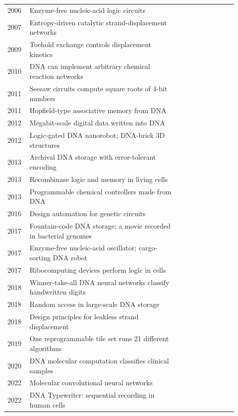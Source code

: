 \begin{center}
\begin{longtable}{@{}p{0.08\linewidth}p{0.62\linewidth}p{0.22\linewidth}@{}}
2006 & Enzyme-free nucleic-acid logic circuits & \cite{Seelig2006}\\
2007 & Entropy-driven catalytic strand-displacement networks & \cite{Zhang2007}\\
2009 & Toehold exchange controls displacement kinetics & \cite{ZhangWinfree2009}\\
2010 & DNA can implement arbitrary chemical reaction networks & \cite{Soloveichik2010}\\
2011 & Seesaw circuits compute square roots of 4-bit numbers & \cite{QianWinfree2011}\\
2011 & Hopfield-type associative memory from DNA & \cite{QianWinfreeBruck2011}\\
2012 & Megabit-scale digital data written into DNA & \cite{Church2012}\\
2012 & Logic-gated DNA nanorobot; DNA-brick 3D structures & \cite{Douglas2012,Ke2012}\\
2013 & Archival DNA storage with error-tolerant encoding & \cite{Goldman2013}\\
2013 & Recombinase logic and memory in living cells & \cite{Siuti2013,Bonnet2013}\\
2013 & Programmable chemical controllers made from DNA & \cite{Chen2013}\\
2016 & Design automation for genetic circuits & \cite{Nielsen2016}\\
2017 & Fountain-code DNA storage; a movie recorded in bacterial genomes & \cite{ErlichZielinski2017,Shipman2017}\\
2017 & Enzyme-free nucleic-acid oscillator; cargo-sorting DNA robot & \cite{Srinivas2017,Thubagere2017}\\
2017 & Ribocomputing devices perform logic in cells & \cite{Green2017}\\
2018 & Winner-take-all DNA neural networks classify handwritten digits & \cite{CherryQian2018}\\
2018 & Random access in large-scale DNA storage & \cite{Organick2018}\\
2018 & Design principles for leakless strand displacement & \cite{Wang2018}\\
2019 & One reprogrammable tile set runs 21 different algorithms & \cite{Woods2019}\\
2020 & DNA molecular computation classifies clinical samples & \cite{Zhang2020cancer}\\
2022 & Molecular convolutional neural networks & \cite{Xiong2022}\\
2022 & DNA Typewriter: sequential recording in human cells & \cite{Choi2022}\\

\end{longtable}
\end{center}

